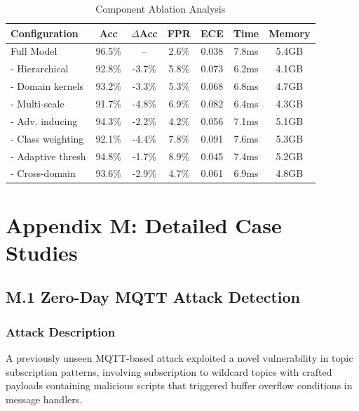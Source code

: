 \documentclass[12pt]{article}
\begin{document}
\begin{table}[H]
\centering
\caption{Component Ablation Analysis}
\begin{tabular}{lcccccc}
\toprule
\textbf{Configuration} & \textbf{Acc} & \textbf{$\Delta$Acc} & \textbf{FPR} & \textbf{ECE} & \textbf{Time} & \textbf{Memory} \\
\midrule
Full Model & 96.5\% & -- & 2.6\% & 0.038 & 7.8ms & 5.4GB \\
\midrule
- Hierarchical & 92.8\% & -3.7\% & 5.8\% & 0.073 & 6.2ms & 4.1GB \\
- Domain kernels & 93.2\% & -3.3\% & 5.3\% & 0.068 & 6.8ms & 4.7GB \\
- Multi-scale & 91.7\% & -4.8\% & 6.9\% & 0.082 & 6.4ms & 4.3GB \\
- Adv. inducing & 94.3\% & -2.2\% & 4.2\% & 0.056 & 7.1ms & 5.1GB \\
- Class weighting & 92.1\% & -4.4\% & 7.8\% & 0.091 & 7.6ms & 5.3GB \\
- Adaptive thresh & 94.8\% & -1.7\% & 8.9\% & 0.045 & 7.4ms & 5.2GB \\
- Cross-domain & 93.6\% & -2.9\% & 4.7\% & 0.061 & 6.9ms & 4.8GB \\
\bottomrule
\end{tabular}
\end{table}

\section{Appendix M: Detailed Case Studies}

\subsection{M.1 Zero-Day MQTT Attack Detection}

\subsubsection{Attack Description}
A previously unseen MQTT-based attack exploited a novel vulnerability in topic subscription patterns, involving subscription to wildcard topics with crafted payloads containing malicious scripts that triggered buffer overflow conditions in message handlers.
\end{document}
